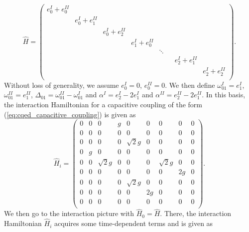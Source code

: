 \begin{equation}
\hat{H} = \left( \begin{array}{ccccccccc}
										e_0^I+e_0^{II} \\
										& e_{0}^I+e_1^{II} \\
										& & e_{0}^I+e_2^{II} \\
										& & & e_{1}^I+e_0^{II} \\
										& & & & \ddots \\
										& & & & & & e_{2}^{I}+e_1^{II} \\
										& & & & & & & e_{2}^{I}+e_2^{II} \\
									\end{array}
					\right).
\end{equation}
%
Without loss of generality, we assume $e_0^{I}=0$, $e_0^{II}=0$. We then define $\omega_{01}^I=e_1^{I}$, $\omega_{01}^{II}=e_1^{II}$, $\Delta_{01} = \omega_{01}^{II}-\omega_{01}^I$ and $\alpha^I = e_2^I-2e_1^{I}$ and $\alpha^{II} = e_2^{II}-2e_1^{II}$. In this basis, the interaction Hamiltonian for a capacitive coupling of the form (\ref{eq:cqed_capacitive_coupling}) is given as
%
\begin{equation}
\hat{H}_i = \left(
			\begin{array}{ccccccccc}
				0 & 0 & 0 & g & 0 & 0 & 0 & 0 & 0 \\
				0 & 0 & 0 & 0 & 0 & 0 & 0 & 0 & 0 \\
				0 & 0 & 0 & 0 & \sqrt{2}g & 0 & 0 & 0 & 0 \\
				0 & g & 0 & 0 & 0 & 0 & 0 & 0 & 0 \\
				0 & 0 & \sqrt{2}g & 0 & 0 & 0 & \sqrt{2}g & 0 & 0 \\
				0 & 0 & 0 & 0 & 0 & 0 & 0 & 2g & 0 \\
				0 & 0 & 0 & 0 & \sqrt{2}g & 0 & 0 & 0 & 0 \\
				0 & 0 & 0 & 0 & 0 & 2g & 0 & 0 & 0 \\
				0 & 0 & 0 & 0 & 0 & 0 & 0 & 0 & 0 \\
			\end{array}
		\right).
\end{equation}
%
We then go to the interaction picture with $\hat{H}_0 = \hat{H}$. There, the interaction Hamiltonian $\hat{H}_i$ acquires some time-dependent terms and is given as
%
